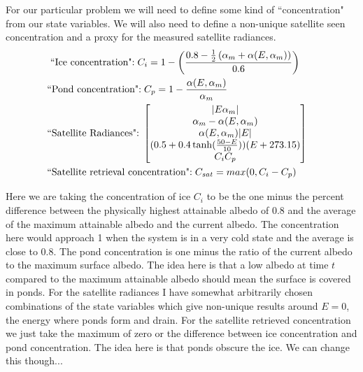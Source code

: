 \documentclass[10pt]{article}
\begin{document}
For our particular problem we will need to define some kind of ``concentration" from our state variables. We will also need to define a non-unique satellite seen concentration and a proxy for the measured satellite radiances.
\begin{align}
&\textrm{ ``Ice concentration":} \hspace{0.1cm}  C_i=1-\left(\frac{0.8-\frac{1}{2}\left( \alpha_m+\alpha(E,\alpha_m)\right)}{0.6}\right)&\\
&\textrm{``Pond concentration":} \hspace{0.1cm} C_p=1-\frac{\alpha(E,\alpha_m)}{\alpha_m}&\\
&\textrm{``Satellite Radiances":} \hspace{0.1cm}
\begin{bmatrix}
|E\alpha_m|\\ 
\alpha_m-\alpha(E,\alpha_m) \\
\alpha(E,\alpha_m)|E|\\
(0.5+0.4\tanh(\frac{50-E}{10}))(E+273.15)\\
C_i C_p
\end{bmatrix}&\\
&\textrm{``Satellite retrieval concentration":}\hspace{0.1cm} C_{sat}=max(0,C_i-C_p) &
\end{align}

Here we are taking the concentration of ice $C_i$ to be the one minus the percent difference between the physically highest attainable albedo of $0.8$ and the average of the maximum attainable albedo and the current albedo. The concentration here would approach 1 when the system is in a very cold state and the average is close to 0.8. The pond concentration is one minus the ratio of the current albedo to the maximum surface albedo. The idea here is that a low albedo at time $t$ compared to the maximum attainable albedo should mean the surface is covered in ponds. For the satellite radiances I have somewhat arbitrarily chosen combinations of the state variables which give non-unique results around $E=0$, the energy where ponds form and drain. For the satellite retrieved concentration we just take the maximum of zero or the difference between ice concentration and pond concentration. The idea here is that ponds obscure the ice. We can change this though...

\section{}




\end{document}
